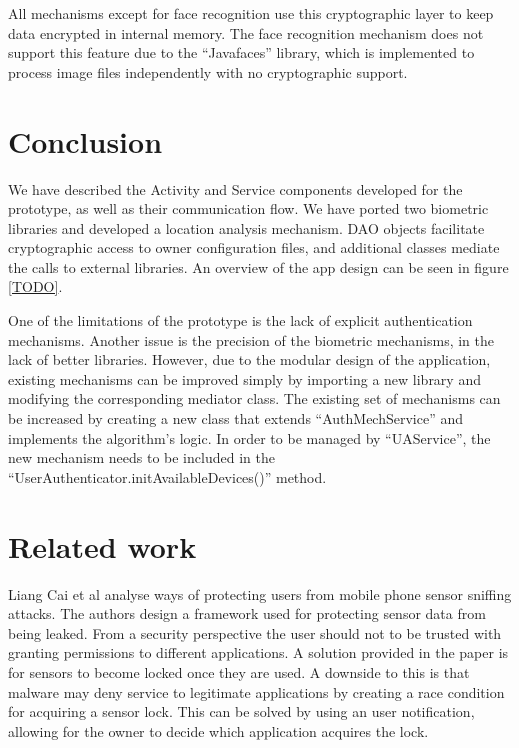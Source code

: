 All mechanisms except for face recognition use this cryptographic layer to keep data encrypted in internal memory. The face recognition mechanism does not support this feature due to the ``Javafaces'' library, which is implemented to process image files independently with no cryptographic support. 

\section{Conclusion}
We have described the Activity and Service components developed for the prototype, as well as their communication flow. We have ported two biometric libraries and developed a location analysis mechanism. DAO objects facilitate cryptographic access to owner configuration files, and additional classes mediate the calls to external libraries. An overview of the app design can be seen in figure \ref{TODO}.

One of the limitations of the prototype is the lack of explicit authentication mechanisms. Another issue is the precision of the biometric mechanisms, in the lack of better libraries. However, due to the modular design of the application, existing mechanisms can be improved simply by importing a new library and modifying the corresponding mediator class. The existing set of mechanisms can be increased by creating a new class that extends ``AuthMechService'' and implements the algorithm's logic. In order to be managed by ``UAService'', the new mechanism needs to be included in the ``UserAuthenticator.initAvailableDevices()'' method.

\section{Related work}
Liang Cai et al \cite{cai2009defending} analyse ways of protecting users from mobile phone sensor sniffing attacks. The authors design a framework used for protecting sensor data from being leaked. From a security perspective the user should not to be trusted with granting permissions to different applications. A solution provided in the paper is for sensors to become locked once they are used. A downside to this is that malware may deny service to legitimate applications by creating a race condition for acquiring a sensor lock. This can be solved by using an user notification, allowing for the owner to decide which application acquires the lock.

